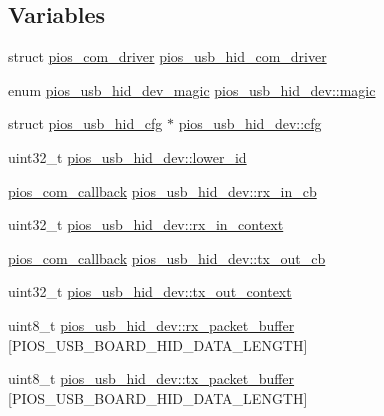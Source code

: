 \subsection*{\-Variables}
\begin{DoxyCompactItemize}
\item 
struct \hyperlink{structpios__com__driver}{pios\-\_\-com\-\_\-driver} \hyperlink{group___p_i_o_s___u_s_b___h_i_d_ga7bc5f832e095cad60f463436e377bb5d}{pios\-\_\-usb\-\_\-hid\-\_\-com\-\_\-driver}
\item 
enum \hyperlink{group___p_i_o_s___u_s_b___h_i_d_ga7769ddfbb58cbf13d0e0662f4d441899}{pios\-\_\-usb\-\_\-hid\-\_\-dev\-\_\-magic} \hyperlink{group___p_i_o_s___u_s_b___h_i_d_ga31a2e7a6eac13138808d37592a55be4e}{pios\-\_\-usb\-\_\-hid\-\_\-dev\-::magic}
\item 
struct \hyperlink{structpios__usb__hid__cfg}{pios\-\_\-usb\-\_\-hid\-\_\-cfg} $\ast$ \hyperlink{group___p_i_o_s___u_s_b___h_i_d_gaed58572b60b7d6cfa67fd0c4d66e882c}{pios\-\_\-usb\-\_\-hid\-\_\-dev\-::cfg}
\item 
uint32\-\_\-t \hyperlink{group___p_i_o_s___u_s_b___h_i_d_ga088a37cd66d7047583d47a16a3381e4f}{pios\-\_\-usb\-\_\-hid\-\_\-dev\-::lower\-\_\-id}
\item 
\hyperlink{group___p_i_o_s___c_o_m_ga23f1888821f1f74a50c02adc459df597}{pios\-\_\-com\-\_\-callback} \hyperlink{group___p_i_o_s___u_s_b___h_i_d_ga0d491f712337fdf9d08be6c72ac81094}{pios\-\_\-usb\-\_\-hid\-\_\-dev\-::rx\-\_\-in\-\_\-cb}
\item 
uint32\-\_\-t \hyperlink{group___p_i_o_s___u_s_b___h_i_d_ga2ce875c5efa2b6b450f143818872513a}{pios\-\_\-usb\-\_\-hid\-\_\-dev\-::rx\-\_\-in\-\_\-context}
\item 
\hyperlink{group___p_i_o_s___c_o_m_ga23f1888821f1f74a50c02adc459df597}{pios\-\_\-com\-\_\-callback} \hyperlink{group___p_i_o_s___u_s_b___h_i_d_ga04c76a0e0e88338371d2f12cd9749309}{pios\-\_\-usb\-\_\-hid\-\_\-dev\-::tx\-\_\-out\-\_\-cb}
\item 
uint32\-\_\-t \hyperlink{group___p_i_o_s___u_s_b___h_i_d_ga1a95563a3fb1aee312d7793c77f81bf2}{pios\-\_\-usb\-\_\-hid\-\_\-dev\-::tx\-\_\-out\-\_\-context}
\item 
uint8\-\_\-t \hyperlink{group___p_i_o_s___u_s_b___h_i_d_ga20fb92cd6b239abc72cb0ac8b93b11b4}{pios\-\_\-usb\-\_\-hid\-\_\-dev\-::rx\-\_\-packet\-\_\-buffer} \mbox{[}\-P\-I\-O\-S\-\_\-\-U\-S\-B\-\_\-\-B\-O\-A\-R\-D\-\_\-\-H\-I\-D\-\_\-\-D\-A\-T\-A\-\_\-\-L\-E\-N\-G\-T\-H\mbox{]}
\item 
uint8\-\_\-t \hyperlink{group___p_i_o_s___u_s_b___h_i_d_gad6c7b8ecc0fe215e9d18d6d3281977c6}{pios\-\_\-usb\-\_\-hid\-\_\-dev\-::tx\-\_\-packet\-\_\-buffer} \mbox{[}\-P\-I\-O\-S\-\_\-\-U\-S\-B\-\_\-\-B\-O\-A\-R\-D\-\_\-\-H\-I\-D\-\_\-\-D\-A\-T\-A\-\_\-\-L\-E\-N\-G\-T\-H\mbox{]}

\end{DoxyCompactItemize}
